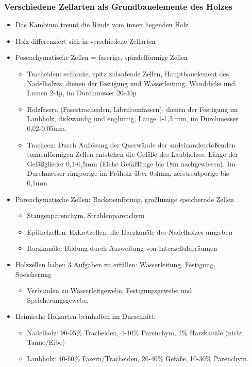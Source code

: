 \documentclass{article}
\begin{document}
\subsubsection{Verschiedene Zellarten als Grundbauelemente des Holzes}
\begin{itemize}
  \item Das Kambium trennt die Rinde vom innen liegenden Holz 
  \item Holz differenziert sich in verschiedene Zellarten
  \item Posenchymatische Zellen = faserige, spindelförmige Zellen
  \begin{itemize}
    \item Tracheiden: schlanke, spitz zulaufende Zellen, Hauptbauelement des
          Nadelholzes, dienen der Festigung und Wasserleitung, Wanddicke und
          Lumen 2-4µ, im Durchmesser 20-40µ
     \item Holzfasern (Fasertracheiden, Librifromfasern): dienen der Festigung
           im Laubholz, dickwandig und englumig, Länge 1-1,5 mm, im Durchmesser
           0,02-0,05mm.
      \item Tracheen: Durch Auflösung der Querwände der andeinanderstoßenden
            tonnenförmigen Zellen entstehen die Gefäße des Laubholzes. Länge
            der Gefäßglieder 0,1-0,5mm (Eiche Gefäßlänge bis 18m
            nachgewiesen). Im Durchmesser ringporige im Früholz über 0,4mm,
            zerstreutporige bis 0,1mm.
  \end{itemize}
  \item Parenchymatische Zellen: Backsteinförmig, großlumige speichernde Zellen
  \begin{itemize}
    \item Stangenparenchym, Strahlenparenchym
    \item Epithelzellen: Exkretzellen, die Harzkanäle des Nadelholzes umgeben
    \item Harzkanäle: Bildung durch Ausweitung von Interzellularräumen
  \end {itemize}
  \item Holzzellen haben 3 Aufgaben zu erfüllen: Wasserleitung, Festigung,
        Speicherung
  \begin{itemize}
    \item Verbunden zu Wasserleitgewebe, Festigungsgewebe und Speicherungsgewebe.
  \end{itemize}
  \item Heimische Holzarten beinhalten im Durschnitt:
  \begin{itemize}
    \item Nadelholz: 90-95\% Tracheiden, 4-10\% Parenchym, 1\% Harzkanäle (nicht
    Tanne/Eibe)
    \item Laubholz: 40-60\% Fasern/Tracheiden, 20-40\% Gefäße, 10-30\%
    Parenchym.
    \end{itemize} 
\end{itemize}
  
\end{document}
